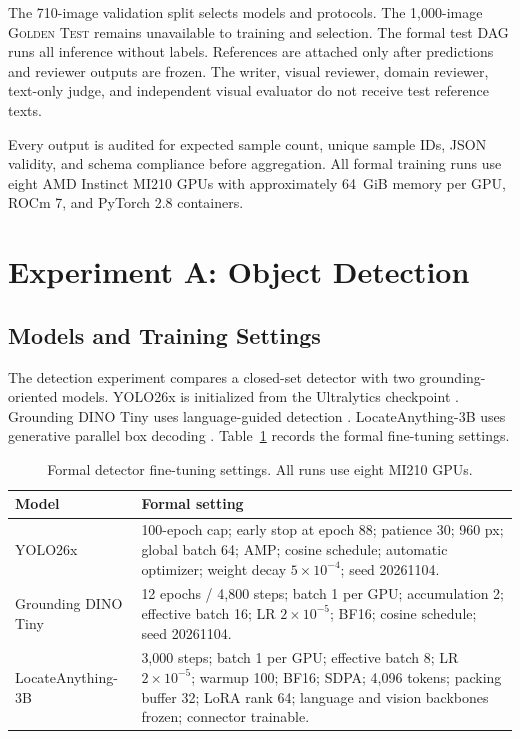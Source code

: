 \documentclass[11pt]{article}
\newcommand{\gold}{\textsc{Golden Test}}
\begin{document}
The 710-image validation split selects models and protocols. The 1,000-image
\gold{} remains unavailable to training and selection. The formal test DAG runs
all inference without labels. References are attached only after predictions
and reviewer outputs are frozen. The writer, visual reviewer, domain reviewer,
text-only judge, and independent visual evaluator do not receive test reference
texts.

Every output is audited for expected sample count, unique sample IDs, JSON
validity, and schema compliance before aggregation. All formal training runs use
eight AMD Instinct MI210 GPUs with approximately 64~GiB memory per GPU, ROCm 7,
and PyTorch 2.8 containers.

\section{Experiment A: Object Detection}

\subsection{Models and Training Settings}

The detection experiment compares a closed-set detector with two grounding-
oriented models. YOLO26x is initialized from the Ultralytics checkpoint
\citep{ultralytics2026}. Grounding DINO Tiny uses language-guided detection
\citep{liu2023grounding}. LocateAnything-3B uses generative parallel box
decoding \citep{wang2026locate}. Table~\ref{tab:det-settings} records the formal
fine-tuning settings.

\begin{table}[H]
\centering
\scriptsize
\renewcommand{\arraystretch}{1.10}
\begin{tabular}{p{1.85cm}p{4.85cm}}
\toprule
Model & Formal setting \\
\midrule
YOLO26x & 100-epoch cap; early stop at epoch 88; patience 30; 960 px; global batch 64; AMP; cosine schedule; automatic optimizer; weight decay $5\times10^{-4}$; seed 20261104. \\
Grounding DINO Tiny & 12 epochs / 4,800 steps; batch 1 per GPU; accumulation 2; effective batch 16; LR $2\times10^{-5}$; BF16; cosine schedule; seed 20261104. \\
LocateAnything-3B & 3,000 steps; batch 1 per GPU; effective batch 8; LR $2\times10^{-5}$; warmup 100; BF16; SDPA; 4,096 tokens; packing buffer 32; LoRA rank 64; language and vision backbones frozen; connector trainable. \\
\bottomrule
\end{tabular}
\caption{Formal detector fine-tuning settings. All runs use eight MI210 GPUs.}
\label{tab:det-settings}
\end{table}
\end{document}
